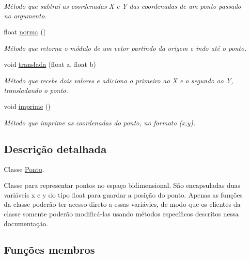 \begin{DoxyCompactItemize}
\begin{DoxyCompactList}\small\item\em Método que subtrai as coordenadas X e Y das coordenadas de um ponto passado no argumento. \end{DoxyCompactList}\item 
float \mbox{\hyperlink{classPonto_a9b0ddbdddd05edbc4d45ef0671a628c6}{norma}} ()
\begin{DoxyCompactList}\small\item\em Método que retorna o módulo de um vetor partindo da origem e indo até o ponto. \end{DoxyCompactList}\item 
void \mbox{\hyperlink{classPonto_a96a4395204ec010814e67d20705e630f}{translada}} (float a, float b)
\begin{DoxyCompactList}\small\item\em Método que recebe dois valores e adiciona o primeiro ao X e o segundo ao Y, transladando o ponto. \end{DoxyCompactList}\item 
\mbox{\label{classPonto_a84758d453e38f237bdf860b6435e9def}} 
void \mbox{\hyperlink{classPonto_a84758d453e38f237bdf860b6435e9def}{imprime}} ()
\begin{DoxyCompactList}\small\item\em Método que imprime as coordenadas do ponto, no formato (x,y). \end{DoxyCompactList}\end{DoxyCompactItemize}


\subsection{Descrição detalhada}
Classe \mbox{\hyperlink{classPonto}{Ponto}}. 

Classe para representar pontos no espaço bidimensional. São encapsuladas duas variáveis x e y do tipo float para guardar a posição do ponto. Apenas as funções da classe poderão ter acesso direto a essas variávies, de modo que os clientes da classe somente poderão modificá-\/las usando métodos específicos descritos nessa documentação. 

\subsection{Funções membros}
\mbox{\label{classPonto_abb68d6122278de262e8ed1c70714e3d9}} 

